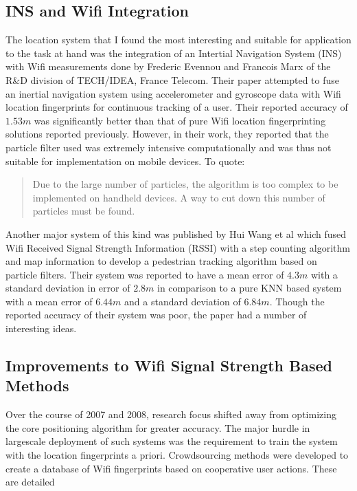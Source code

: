 \subsection{INS and Wifi Integration}

The location system that I found the most interesting and suitable for application to the task at hand was the integration of an Intertial Navigation System (INS) with Wifi measurements done by Frederic Evennou and Francois Marx of the R\&D division of TECH/IDEA, France Telecom. Their paper \cite{Evennou} attempted to fuse an inertial navigation system using  accelerometer and gyroscope data with Wifi location fingerprints for continuous tracking of a user. Their reported accuracy of $1.53 m$ was significantly better than that of pure Wifi location fingerprinting solutions reported previously. However, in their work, they reported that the particle filter used was extremely intensive computationally and was thus not suitable for implementation on mobile devices. To quote:

\begin{quote}
Due to the large number of particles, the
algorithm is too complex to be implemented on handheld
devices. A way to cut down this number of particles must be
found.\cite{Evennou}
\end{quote}

Another major system of this kind was published by Hui Wang et al\cite{Wang} which fused Wifi Received Signal Strength Information (RSSI) with a step counting algorithm and map information to develop a pedestrian tracking algorithm based on particle filters. Their system was reported to have a mean error of $4.3 m$ with a standard deviation in error of $2.8 m$ in comparison to a pure KNN based system with a mean error of $6.44 m$ and a standard deviation of $6.84 m$. Though the reported accuracy of their system was poor, the paper had a number of interesting ideas.

\subsection{Improvements to Wifi Signal Strength Based Methods}

Over the course of 2007 and 2008, research focus shifted away from optimizing the core positioning algorithm for greater accuracy. The major hurdle in largescale deployment of such systems was the requirement to train the system with the location fingerprints a priori. Crowdsourcing methods were developed to create a database of Wifi fingerprints based on cooperative user actions. These are detailed 


